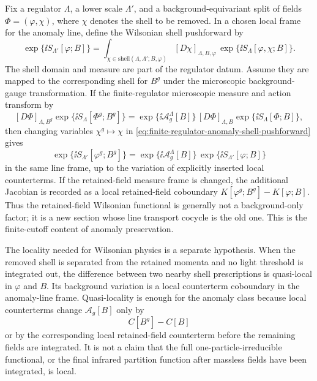 \begin{remark}
Fix a regulator \(\Lambda\), a lower scale \(\Lambda'\), and a
background-equivariant split of fields
\(\Phi=(\varphi,\chi)\), where \(\chi\) denotes the shell to be removed.  In a
chosen local frame for the anomaly line, define the Wilsonian shell
pushforward by
\begin{equation}
  \exp\{\ii S_{\Lambda'}[\varphi;B]\}
  =
  \int_{\chi\in\mathrm{shell}(\Lambda,\Lambda';B,\varphi)}
  [D\chi]_{\Lambda,B,\varphi}\,
  \exp\{\ii S_{\Lambda}[\varphi,\chi;B]\}.
  \label{eq:finite-regulator-anomaly-shell-pushforward}
\end{equation}
The shell domain and measure are part of the regulator datum.  Assume they are
mapped to the corresponding shell for \(B^g\) under the microscopic
background-gauge transformation.  If the finite-regulator microscopic measure
and action transform by
\[
  [D\Phi]_{\Lambda,B^g}\exp\{\ii S_\Lambda[\Phi^g;B^g]\}
  =
  \exp\{\ii\mathcal A^\Lambda_g[B]\}\,
  [D\Phi]_{\Lambda,B}\exp\{\ii S_\Lambda[\Phi;B]\},
\]
then changing variables \(\chi^g\mapsto\chi\) in
\eqref{eq:finite-regulator-anomaly-shell-pushforward} gives
\begin{equation}
  \exp\{\ii S_{\Lambda'}[\varphi^g;B^g]\}
  =
  \exp\{\ii\mathcal A^\Lambda_g[B]\}\,
  \exp\{\ii S_{\Lambda'}[\varphi;B]\}
  \label{eq:finite-regulator-shell-inherits-anomaly}
\end{equation}
in the same line frame, up to the variation of explicitly inserted local
counterterms.  If the retained-field measure frame is changed, the additional
Jacobian is recorded as a local retained-field coboundary
\(K[\varphi^g;B^g]-K[\varphi;B]\).  Thus the retained-field Wilsonian
functional is generally not a background-only factor; it is a new section whose
line transport cocycle is the old one.  This is the finite-cutoff content of
anomaly preservation.

The locality needed for Wilsonian physics is a separate hypothesis.  When the
removed shell is separated from the retained momenta and no light threshold is
integrated out, the difference between two nearby shell prescriptions is
quasi-local in \(\varphi\) and \(B\).  Its background variation is a local
counterterm coboundary in the anomaly-line frame.  Quasi-locality is enough for
the anomaly class because local counterterms change
\(\mathcal A_g[B]\) only by
\[
  C[B^g]-C[B]
\]
or by the corresponding local retained-field counterterm before the remaining
fields are integrated.  It is not a claim that the full one-particle-irreducible
functional, or the final infrared partition function after massless fields have
been integrated, is local.


\end{remark}
